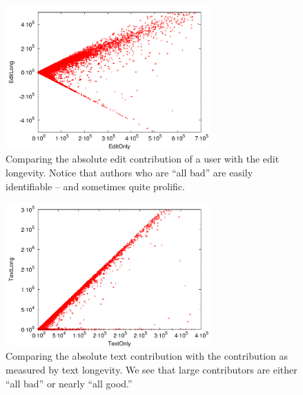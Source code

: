 \begin{figure}[t]
    \begin{center}
    \includegraphics[width=0.70\textwidth]{part-I10-contrib/graphs/score-zoom-editonly-editlong}
    \end{center}
    \caption[EditOnly vs EditLong]{
    	Comparing the absolute edit contribution of a user
	with the edit longevity.
	Notice that authors who are ``all bad''
	are easily identifiable -- and sometimes quite prolific.
    }
    \label{fig-zoom-editonly-editlong}
\end{figure}
%
\begin{figure}[t]
    \begin{center}
    \includegraphics[width=0.70\textwidth]{part-I10-contrib/graphs/score-zoom-textonly-textlong}
    \end{center}
    \caption[TextOnly vs TextLong]{
    	Comparing the absolute text contribution with the contribution
	as measured by text longevity.
	We see that large contributors are either ``all bad''
	or nearly ``all good.''
    }
    \label{fig-zoom-textonly-textlong}
\end{figure}
%
